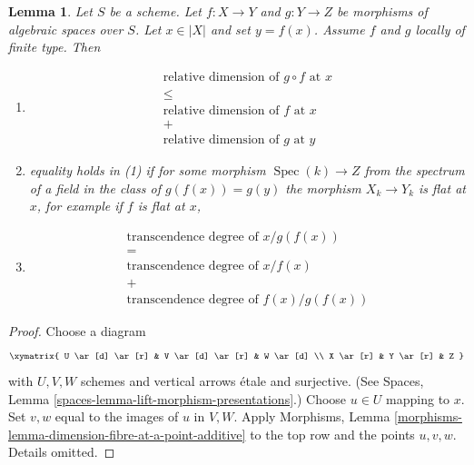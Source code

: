 \documentclass{stacks-project}
\theoremstyle{plain}
\newtheorem{lemma}[subsection]{Lemma}
\theoremstyle{definition}
\theoremstyle{remark}
\numberwithin{equation}{subsection}
\def\Spec{\mathop{\mathrm{Spec}}}
\begin{document}
\begin{lemma}
\label{lemma-dimension-fibre-at-a-point-additive}
Let $S$ be a scheme.
Let $f : X \to Y$ and $g : Y \to Z$ be morphisms of algebraic spaces over $S$.
Let $x \in |X|$ and set $y = f(x)$.
Assume $f$ and $g$ locally of finite type.
Then
\begin{enumerate}
\item
$$
\begin{matrix}
\text{relative dimension of }g \circ f\text{ at }x \\
\leq \\
\text{relative dimension of }f\text{ at }x \\
+ \\
\text{relative dimension of }g\text{ at }y
\end{matrix}
$$
\item equality holds in (1) if for some morphism $\Spec(k) \to Z$
from the spectrum of a field in the class of $g(f(x)) = g(y)$
the morphism $X_k \to Y_k$ is flat at $x$, for example if $f$ is flat at $x$,
\item
$$
\begin{matrix}
\text{transcendence degree of }x/g(f(x)) \\
= \\
\text{transcendence degree of }x/f(x) \\
+ \\
\text{transcendence degree of }f(x)/g(f(x))
\end{matrix}
$$
\end{enumerate}
\end{lemma}

\begin{proof}
Choose a diagram
$$
\xymatrix{
U \ar[d] \ar[r] & V \ar[d] \ar[r] & W \ar[d] \\
X \ar[r] & Y \ar[r] & Z
}
$$
with $U, V, W$ schemes and vertical arrows \'etale and surjective. (See
Spaces, Lemma \ref{spaces-lemma-lift-morphism-presentations}.)
Choose $u \in U$ mapping to $x$. Set $v, w$ equal to the images
of $u$ in $V, W$.
Apply
Morphisms, Lemma \ref{morphisms-lemma-dimension-fibre-at-a-point-additive}
to the top row and the points $u, v, w$. Details omitted.
\end{proof}
\end{document}
